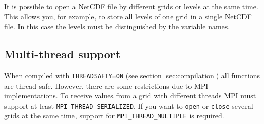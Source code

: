 It is possible to open a NetCDF file by different grids or levels at the same time. This allows you, for example, to store all levels of one grid in a single NetCDF file. In this case the levels must be distinguished by the variable names.

\subsection{Multi-thread support}

When compiled with \texttt{THREADSAFTY=ON} (see section \ref{sec:compilation}) all functions are thread-safe. However, there are some restrictions due to MPI implementations. To receive values from a grid with different threads MPI must support at least \texttt{MPI\_THREAD\_SERIALIZED}. If you want to \texttt{open} or \texttt{close} several grids at the same time, support for \texttt{MPI\_THREAD\_MULTIPLE} is required.


